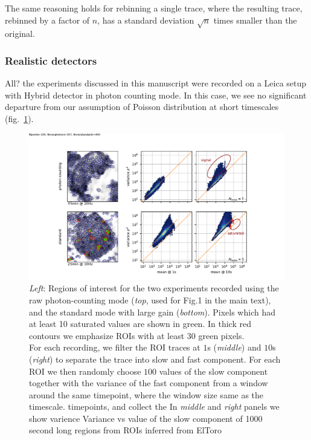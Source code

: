 \documentclass[a4paper,11pt,oneside,]{article}
\begin{document}
The same reasoning holds for rebinning a single trace, where the resulting trace, rebinned by a factor of $n$,  has a standard deviation $\sqrt{n}$ times smaller than the original.


\subsubsection{Realistic detectors}
All{\color{red}?} the experiments discussed in this manuscript were recorded on a Leica setup with Hybrid detector in photon counting mode.
In this case, we see no significant departure from our assumption of Poisson distribution at short timescales (fig.~\ref{fig:mean_vs_var}).


\begin{figure}[t]
 \centering
 \includegraphics[trim=25mm 0 20mm 10mm, clip]{figures/mean_vs_var.pdf}
 \caption{
 {\it Left}: Regions of interest for the two experiments recorded using the raw photon-counting mode ({\it top}, used for {\color{red} Fig.1} in the main text), and the standard mode with large gain ({\it bottom}). Pixels which had at least 10 saturated values are shown in green. In thick red contours we emphasize ROIs with at least 30 green pixels.
 \\
 For each recording, we filter the ROI traces at $1$s ({\it middle}) and $10$s ({\it right}) to separate the trace into slow and fast component. For each ROI we then randomly choose $100$ values of the slow component together with the variance of the fast component from a window around the same timepoint, where the window size same as the timescale.
 timepoints, and collect the 
 In {\it middle} and {\it right} panels we show varience
 Variance vs value of the slow component of 1000 second long regions from ROIs inferred from {\color{red} ElToro}
 }
 \label{fig:mean_vs_var}
\end{figure}
\end{document}
